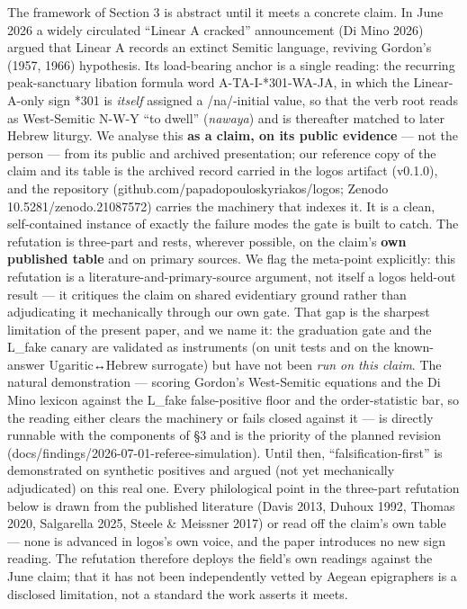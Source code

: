 \documentclass[
  10pt,
]{article}
\begin{document}
The framework of Section 3 is abstract until it meets a concrete claim.
In June 2026 a widely circulated ``Linear A cracked'' announcement (Di
Mino 2026) argued that Linear A records an extinct Semitic language,
reviving Gordon's (1957, 1966) hypothesis. Its load-bearing anchor is a
single reading: the recurring peak-sanctuary libation formula word
A-TA-I-*301-WA-JA, in which the Linear-A-only sign *301 is \emph{itself}
assigned a /na/-initial value, so that the verb root reads as
West-Semitic N-W-Y ``to dwell'' (\emph{nawaya}) and is thereafter
matched to later Hebrew liturgy. We analyse this \textbf{as a claim, on
its public evidence} --- not the person --- from its public and archived
presentation; our reference copy of the claim and its table is the
archived record carried in the logos artifact (v0.1.0), and the
repository (github.com/papadopouloskyriakos/logos; Zenodo
10.5281/zenodo.21087572) carries the machinery that indexes it. It is a
clean, self-contained instance of exactly the failure modes the gate is
built to catch. The refutation is three-part and rests, wherever
possible, on the claim's \textbf{own published table} and on primary
sources. We flag the meta-point explicitly: this refutation is a
literature-and-primary-source argument, not itself a logos held-out
result --- it critiques the claim on shared evidentiary ground rather
than adjudicating it mechanically through our own gate. That gap is the
sharpest limitation of the present paper, and we name it: the graduation
gate and the L\_fake canary are validated as instruments (on unit tests
and on the known-answer Ugaritic↔Hebrew surrogate) but have not been
\emph{run on this claim}. The natural demonstration --- scoring Gordon's
West-Semitic equations and the Di Mino lexicon against the L\_fake
false-positive floor and the order-statistic bar, so the reading either
clears the machinery or fails closed against it --- is directly runnable
with the components of §3 and is the priority of the planned revision
(docs/findings/2026-07-01-referee-simulation). Until then,
``falsification-first'' is demonstrated on synthetic positives and
argued (not yet mechanically adjudicated) on this real one. Every
philological point in the three-part refutation below is drawn from the
published literature (Davis 2013, Duhoux 1992, Thomas 2020, Salgarella
2025, Steele \& Meissner 2017) or read off the claim's own table ---
none is advanced in logos's own voice, and the paper introduces no new
sign reading. The refutation therefore deploys the field's own readings
against the June claim; that it has not been independently vetted by
Aegean epigraphers is a disclosed limitation, not a standard the work
asserts it meets.
\end{document}
